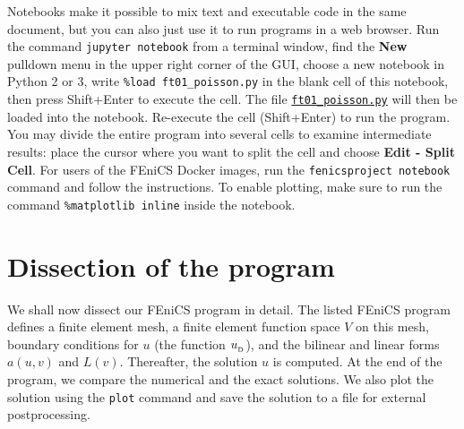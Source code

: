 \documentclass[graybox,envcountchap,sectrefs,final]{svmonodo}
\begin{document}
Notebooks make it possible to mix text and executable code in the same
document, but you can also just use it to run programs in a web
browser. Run the command \texttt{jupyter notebook} from a terminal window,
find the \textbf{New} pulldown menu in the upper right corner of the GUI,
choose a new notebook in Python 2 or 3, write \Verb!%load ft01_poisson.py! in the blank cell of this notebook, then press
Shift+Enter to execute the cell.  The file \href{{https://fenicsproject.org/pub/tutorial/python/vol1/ft01_poisson.py}}{\nolinkurl{ft01_poisson.py}} will then be loaded into the
notebook.  Re-execute the cell (Shift+Enter) to run the program. You
may divide the entire program into several cells to examine
intermediate results: place the cursor where you want to split the
cell and choose \textbf{Edit - Split Cell}. For users of the FEniCS Docker
images, run the \texttt{fenicsproject notebook} command and follow the
instructions. To enable plotting, make sure to run the command
\Verb!%matplotlib inline! inside the notebook.

\section{Dissection of the program}
\label{ch:poisson0:impl:dissect}


We shall now dissect our FEniCS program in detail.  The listed FEniCS
program defines a finite element mesh, a finite element function space
$V$ on this mesh, boundary conditions for $u$ (the function $\ub$),
and the bilinear and linear forms $a(u,v)$ and $L(v)$. Thereafter, the
solution $u$ is computed. At the end of the program, we compare the
numerical and the exact solutions. We also plot the solution using the
\texttt{plot} command and save the solution to a file for external
postprocessing.
\end{document}
